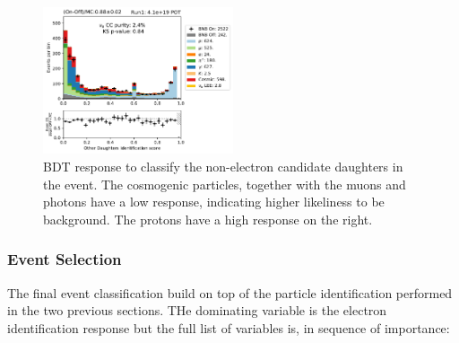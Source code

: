 
\begin{figure}
    \centering
    \includegraphics[width=0.5\textwidth]{NueCCsel/Images/run1/pre_daughter_score.pdf}
    \caption{BDT response to classify the non-electron candidate daughters in the event. The cosmogenic particles, together with the muons and photons have a low response, indicating higher likeliness to be background. The protons have a high response on the right.}
    \label{fig:pre_daughter_score}
\end{figure}

\subsubsection{Event Selection}
The final event classification build on top of the particle identification performed in the two previous sections. THe dominating variable is the electron identification response but the full list of variables is, in sequence of importance:

